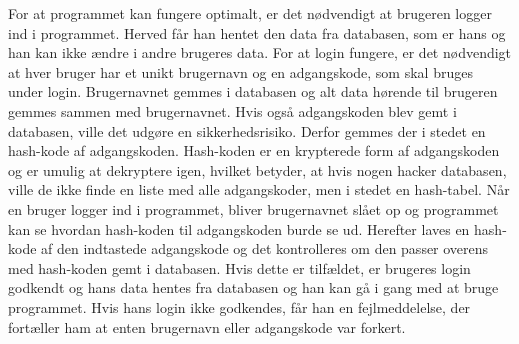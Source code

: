 For at programmet kan fungere optimalt, er det nødvendigt at brugeren logger ind i programmet. Herved får han hentet den data fra databasen, som er hans og han kan ikke ændre i andre brugeres data.
For at login fungere, er det nødvendigt at hver bruger har et unikt brugernavn og en adgangskode, som skal bruges under login. Brugernavnet gemmes i databasen og alt data hørende til brugeren gemmes sammen med brugernavnet. Hvis også adgangskoden blev gemt i databasen, ville det udgøre en sikkerhedsrisiko. Derfor gemmes der i stedet en hash-kode af adgangskoden. Hash-koden er en krypterede form af adgangskoden og er umulig at dekryptere igen, hvilket betyder, at hvis nogen hacker databasen, ville de ikke finde en liste med alle adgangskoder, men i stedet en hash-tabel.
Når en bruger logger ind i programmet, bliver brugernavnet slået op og programmet kan se hvordan hash-koden til adgangskoden burde se ud. Herefter laves en hash-kode af den indtastede adgangskode og det kontrolleres om den passer overens med hash-koden gemt i databasen. Hvis dette er tilfældet, er brugeres login godkendt og hans data hentes fra databasen og han kan gå i gang med at bruge programmet. Hvis hans login ikke godkendes, får han en fejlmeddelelse, der fortæller ham at enten brugernavn eller adgangskode var forkert. 
